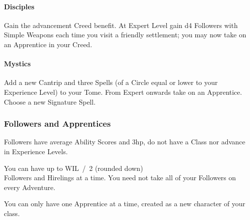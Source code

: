 \documentclass[itdr]{subfiles}
\begin{document}
\paragraph{Disciples}
Gain the advancement Creed benefit. At Expert Level gain d4 Followers with Simple Weapons each time you visit a friendly settlement; you may now take on an Apprentice in your Creed.

\paragraph{Mystics} Add a new Cantrip and three Spells (of a Circle equal or lower to your Experience Level) to your Tome. From Expert onwards take on an Apprentice. Choose a new Signature Spell.

\subsubsection{Followers and Apprentices}
Followers have average Ability Scores and 3hp, do not have a Class nor advance in Experience Levels.

You can have up to WIL~/~2 (rounded down)\\Followers and Hirelings at a time. You need not take all of your Followers on every Adventure.

You can only have one Apprentice at a time, created as a new character of your class. 
\end{document}
